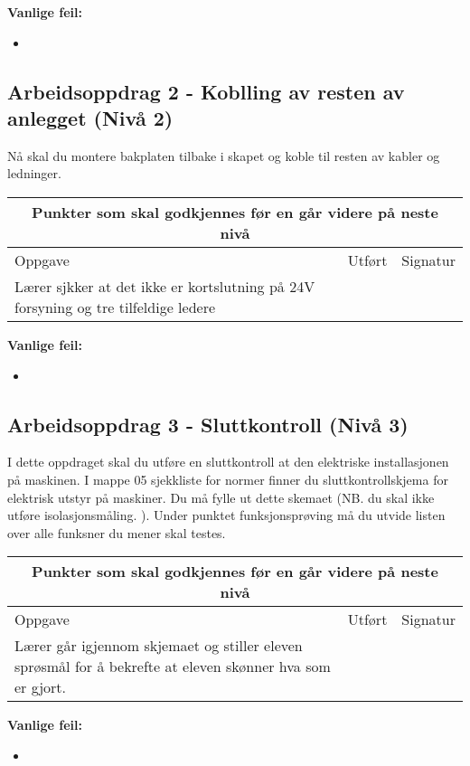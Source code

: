 \textbf{Vanlige feil:}
\begin{itemize}[noitemsep]
	\item 
\end{itemize}
\newpage
\subsection*{Arbeidsoppdrag 2 - Koblling av resten av anlegget (Nivå 2)}

Nå skal du montere bakplaten tilbake i skapet og koble til resten av kabler og ledninger. 

\begin{center}
\begin{tabular}{ | m{8cm} | m{1cm}| m{2cm} | } 
\hline
\multicolumn{3}{|c|}{Punkter som skal godkjennes før en går videre på neste nivå} \\
	\hline
	Oppgave	& Utført & Signatur \\ 
	\hline
Lærer sjkker at det ikke er kortslutning på 24V forsyning og tre tilfeldige ledere & & \\ 
	\hline
\end{tabular}
\end{center}
\textbf{Vanlige feil:}
\begin{itemize}[noitemsep]
	\item 
\end{itemize}
\newpage
\subsection*{Arbeidsoppdrag 3 - Sluttkontroll (Nivå 3)}

I dette oppdraget skal du utføre en sluttkontroll at den elektriske installasjonen på maskinen. I mappe 05 sjekkliste for normer finner du sluttkontrollskjema for elektrisk utstyr på maskiner. Du må fylle ut dette skemaet (NB. du skal ikke utføre isolasjonsmåling. ). Under punktet funksjonsprøving må du utvide listen over alle funksner du mener skal testes. 

\begin{center}
\begin{tabular}{ | m{8cm} | m{1cm}| m{2cm} | } 
\hline
\multicolumn{3}{|c|}{Punkter som skal godkjennes før en går videre på neste nivå} \\
	\hline
	Oppgave	& Utført & Signatur \\ 
	\hline
Lærer går igjennom skjemaet og stiller eleven sprøsmål for å bekrefte at eleven skønner hva som er gjort. & & \\ 
	\hline
\end{tabular}
\end{center}
\textbf{Vanlige feil:}
\begin{itemize}[noitemsep]
	\item 
\end{itemize}
\newpage

